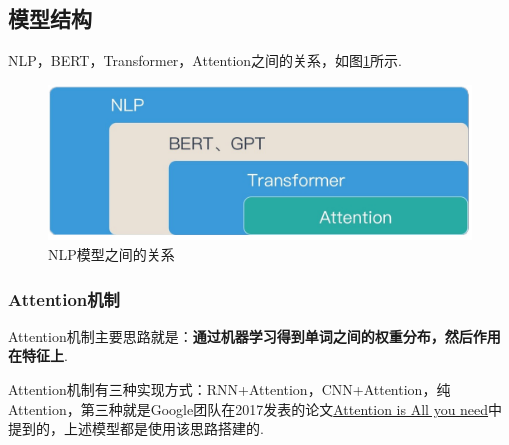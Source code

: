 \documentclass[12pt, a4paper, oneside]{ctexart}
\numberwithin{equation}{section}  %
\begin{document}
\subsection{模型结构}

NLP，BERT，Transformer，Attention之间的关系，如图\ref{fig-relation}所示.

\begin{figure}[htbp]
\centering
\includegraphics[scale=0.4]{../NLP大作业note.figure/Bert,Transformer,Attention之间的关系.jpg}
\caption{NLP模型之间的关系}
\label{fig-relation}
\end{figure}

\subsubsection{Attention机制}

Attention机制主要思路就是：\textbf{通过机器学习得到单词之间的权重分布，然后作用在特征上}.

Attention机制有三种实现方式：RNN+Attention，CNN+Attention，纯Attention，第三种就是Google团队在2017发表的论文\href{https://arxiv.org/pdf/1706.03762.pdf}{Attention
is All you need}中提到的，上述模型都是使用该思路搭建的.
\end{document}

